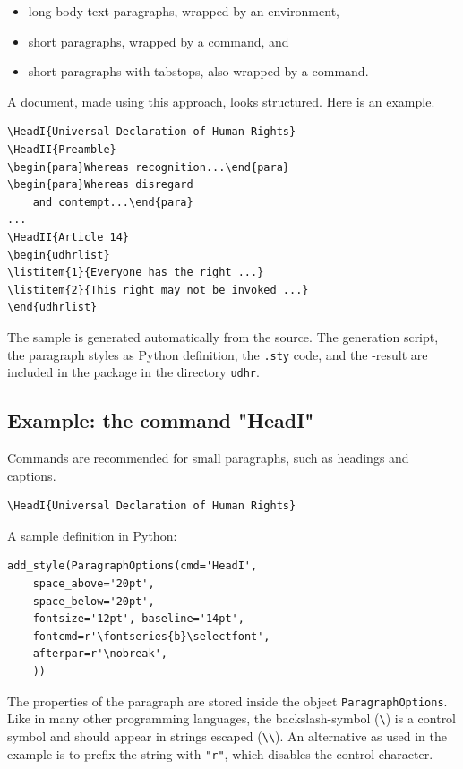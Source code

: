 \documentclass[]{ltugboat}
\begin{document}
\begin{itemize}
\item long body text paragraphs, wrapped by an environment,
\item short paragraphs, wrapped by a command, and
\item short paragraphs with tabstops, also wrapped by a command.
\end{itemize}

A document, made using this approach, looks structured. Here is an example.

\begin{verbatim}
\HeadI{Universal Declaration of Human Rights}
\HeadII{Preamble}
\begin{para}Whereas recognition...\end{para}
\begin{para}Whereas disregard
    and contempt...\end{para}
...
\HeadII{Article 14}
\begin{udhrlist}
\listitem{1}{Everyone has the right ...}
\listitem{2}{This right may not be invoked ...}
\end{udhrlist}
\end{verbatim}

The sample is generated automatically from the \XML{} source. The generation script, the paragraph styles as Python definition, the \verb|.sty| code, and the -result are included in the package in the directory \verb|udhr|.

\subsection{Example: the command "HeadI"}

Commands are recommended for small paragraphs, such as headings and captions.

\begin{verbatim}
\HeadI{Universal Declaration of Human Rights}
\end{verbatim}

A sample definition in Python:

\begin{verbatim}
add_style(ParagraphOptions(cmd='HeadI',
    space_above='20pt',
    space_below='20pt',
    fontsize='12pt', baseline='14pt',
    fontcmd=r'\fontseries{b}\selectfont',
    afterpar=r'\nobreak',
    ))
\end{verbatim}

The properties of the paragraph are stored inside the object \verb|ParagraphOptions|. Like in many other programming languages, the backslash-symbol (\verb|\|) is a control symbol and should appear in strings escaped (\verb|\\|). An alternative as used in the example is to prefix the string with \verb|"r"|, which disables the control character.
\end{document}
